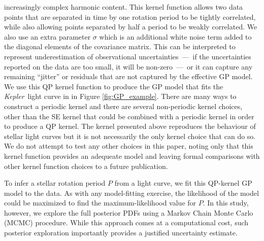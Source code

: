 \documentclass[useAMS, usenatbib, preprint, 12pt]{aastex}
\newcommand{\Kepler}{{\it Kepler}}
\begin{document}
increasingly complex harmonic content.
This kernel function allows two data points that are separated in time by one
rotation period to be tightly correlated, while also allowing
points separated by half a period to be weakly correlated.
We also use an extra parameter $\sigma$ which is an additional white noise
term added to the diagonal elements of the covariance matrix.
This can be interpreted to represent underestimation of observational
uncertainties~---~if the uncertainties reported on the data are too small, it
will be non-zero~---~or it can capture any remaining ``jitter'' or residuals
that are not captured by the effective GP model.
We use this QP kernel function to produce the GP model
that fits the \Kepler\ light curve in in Figure \ref{fig:GP_example}.
There are many ways to construct a periodic kernel and there are several
non-periodic kernel choices, other than the SE kernel that could be combined
with a periodic kernel in order to produce a QP kernel.
The kernel presented above reproduces the behaviour of stellar light curves
but it is not necessarily the only kernel choice that can do so.
We do not attempt to test any other choices in this paper, noting only that
this kernel function provides an adequeate model and leaving formal
comparisons with other kernel function choices to a future publication.

To infer a stellar rotation period $P$ from a light curve, we fit this
QP-kernel GP model to the data.  As with any model-fitting exercise, the
likelihood
of the model could be maximized to find the maximum-likelihood value for $P$.
In this study, however, we explore the full posterior PDFs using a Markov
Chain Monte Carlo (MCMC) procedure.  While
this approach comes at a computational cost, such posterior exploration
importantly provides a justified uncertainty estimate.
\end{document}
